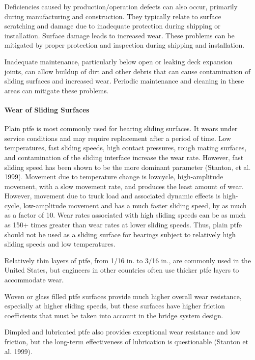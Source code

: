Deficiencies caused by production/operation defects can also occur, primarily during manufacturing and
construction. They typically relate to surface scratching and damage due to inadequate protection during shipping or
installation. Surface damage leads to increased wear. These problems can be mitigated by proper protection and
inspection during shipping and installation.

Inadequate maintenance, particularly below open or leaking deck expansion joints, can allow buildup of dirt and
other debris that can cause contamination of sliding surfaces and increased wear. Periodic maintenance and cleaning
in these areas can mitigate these problems.

\paragraph{Wear of Sliding Surfaces}
Plain \acrshort{ptfe} is most commonly used for bearing sliding surfaces. It wears under service conditions and may
require replacement after a period of time. Low temperatures, fast sliding speeds, high contact pressures, rough
mating surfaces, and contamination of the sliding interface increase the wear rate. However, fast sliding speed has
been shown to be the more dominant parameter (Stanton, et al. 1999). Movement due to temperature change is lowcycle,
high-amplitude movement, with a slow movement rate, and produces the least amount of wear. However,
movement due to truck load and associated dynamic effects is high-cycle, low-amplitude movement and has a much
faster sliding speed, by as much as a factor of 10. Wear rates associated with high sliding speeds can be as much as
150+ times greater than wear rates at lower sliding speeds. Thus, plain \acrshort{ptfe} should not be used as a sliding surface
for bearings subject to relatively high sliding speeds and low temperatures.

Relatively thin layers of \acrshort{ptfe}, from 1/16 in. to 3/16 in., are commonly used in the United States, but engineers
in other countries often use thicker \acrshort{ptfe} layers to accommodate wear.

Woven or glass filled \acrshort{ptfe} surfaces provide much higher overall wear resistance, especially at higher sliding
speeds, but these surfaces have higher friction coefficients that must be taken into account in the bridge system
design.

Dimpled and lubricated \acrshort{ptfe} also provides exceptional wear resistance and low friction, but the long-term
effectiveness of lubrication is questionable (Stanton et al. 1999).


